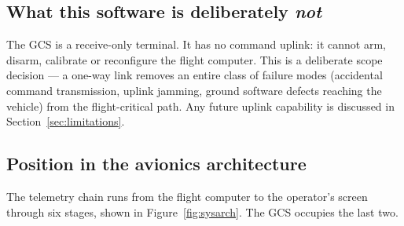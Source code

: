 \documentclass[11pt,a4paper]{article}
\begin{document}
\subsection{What this software is deliberately \emph{not}}

The GCS is a receive-only terminal. It has no command uplink: it cannot
arm, disarm, calibrate or reconfigure the flight computer. This is a
deliberate scope decision --- a one-way link removes an entire class of
failure modes (accidental command transmission, uplink jamming, ground
software defects reaching the vehicle) from the flight-critical path. Any
future uplink capability is discussed in
Section~\ref{sec:limitations}.

\subsection{Position in the avionics architecture}

The telemetry chain runs from the flight computer to the operator's screen
through six stages, shown in Figure~\ref{fig:sysarch}. The GCS occupies the
last two.
\end{document}
